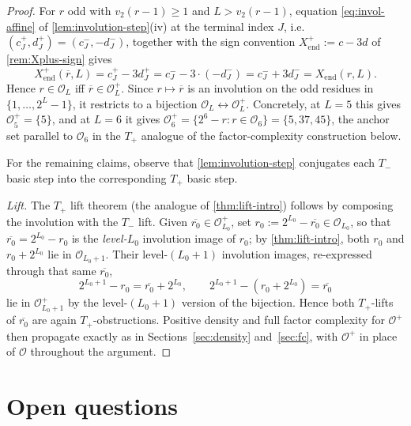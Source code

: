 \documentclass[11pt,reqno]{amsart}
\newcommand{\Tplus}{T_{+}}
\newcommand{\Tminus}{T_{-}}
\newcommand{\Obs}{\mathcal{O}}
\newcommand{\Xend}{X_{\mathrm{end}}}
\newcommand{\vtwo}{v_{2}}
\begin{document}
\begin{proof}
For $r$ odd with $\vtwo(r-1) \ge 1$ and $L > \vtwo(r-1)$, equation
\eqref{eq:invol-affine} of \cref{lem:involution-step}(iv) at the
terminal index $J$, i.e.\ $(c_J^{+}, d_J^{+}) = (c_J^{-}, -d_J^{-})$, together
with the sign convention $\Xend^{+} := c - 3d$ of \cref{rem:Xplus-sign} gives
\[
\Xend^{+}(\overline{r}, L) = c_J^{+} - 3 d_J^{+}
  = c_J^{-} - 3 \cdot (-d_J^{-})
  = c_J^{-} + 3 d_J^{-}
  = \Xend(r, L).
\]
Hence $r \in \Obs_L$ iff $\overline{r} \in \Obs_L^{+}$. Since
$r \mapsto \overline{r}$ is an involution on the odd residues in
$\{1, \ldots, 2^L - 1\}$, it restricts to a bijection
$\Obs_L \leftrightarrow \Obs_L^{+}$. Concretely, at $L = 5$ this gives
$\Obs_5^{+} = \{5\}$, and at $L = 6$ it gives
$\Obs_6^{+} = \{2^6 - r : r \in \Obs_6\} = \{5, 37, 45\}$, the anchor set
parallel to $\Obs_6$ in the $\Tplus$ analogue of the
factor-complexity construction below.

For the remaining claims, observe that
\cref{lem:involution-step} conjugates each $\Tminus$ basic step
into the corresponding $\Tplus$ basic step.

\emph{Lift.} The $\Tplus$ lift theorem (the analogue of
\cref{thm:lift-intro}) follows by composing the involution with the
$\Tminus$ lift. Given $\overline{r_0} \in \Obs_{L_0}^{+}$, set
$r_0 := 2^{L_0} - \overline{r_0} \in \Obs_{L_0}$, so that $\overline{r_0} =
2^{L_0} - r_0$ is the \emph{level-$L_0$} involution image of $r_0$; by
\cref{thm:lift-intro}, both $r_0$ and $r_0 + 2^{L_0}$ lie in $\Obs_{L_0+1}$.
Their level-$(L_0+1)$ involution images, re-expressed through that same
$\overline{r_0}$,
\[
2^{L_0+1} - r_0 = \overline{r_0} + 2^{L_0}, \qquad
2^{L_0+1} - (r_0 + 2^{L_0}) = \overline{r_0}
\]
lie in $\Obs_{L_0+1}^{+}$ by the level-$(L_0+1)$ version of the bijection.
Hence both $\Tplus$-lifts of $\overline{r_0}$ are again
$\Tplus$-obstructions.
Positive density and full factor complexity for $\Obs^{+}$ then
propagate exactly as in Sections~\ref{sec:density}
and~\ref{sec:fc}, with $\Obs^{+}$ in place of $\Obs$ throughout the
argument. \qedhere
\end{proof}

\section{Open questions}
\label{sec:open}
\end{document}
